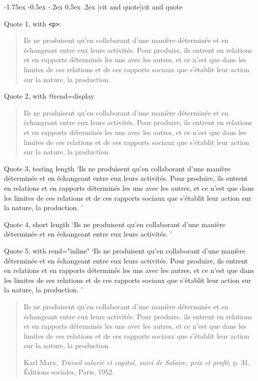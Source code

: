\documentclass[11pt,twoside]{article}\makeatletter
\makeatletter
\renewcommand\section{\@startsection {section}{1}{\z@}%
     {-1.75ex \@plus -0.5ex \@minus -.2ex}%
     {0.5ex \@plus .2ex}%
     {\reset@font\Large\bfseries\sffamily}}
\makeatother
\begin{document}
\section[{cit and quote}]{cit and quote}\par
Quote 1, with \texttt{<p>}: \begin{quote}\par
Ils ne produisent qu’en collaborant d’une manière déterminée et en échangeant entre eux leurs activités. Pour produire, ils entrent en relations et en rapports déterminés les uns avec les autres, et ce n’est que dans les limites de ces relations et de ces rapports sociaux que s’établit leur action sur la nature, la production.\end{quote}\par
Quote 2, with @rend=display \begin{quote}Ils ne produisent qu’en collaborant d’une manière déterminée et en échangeant entre eux leurs activités. Pour produire, ils entrent en relations et en rapports déterminés les uns avec les autres, et ce n’est que dans les limites de ces relations et de ces rapports sociaux que s’établit leur action sur la nature, la production. \end{quote}\par
Quote 3, testing length ‘Ils ne produisent qu’en collaborant d’une manière déterminée et en échangeant entre eux leurs activités. Pour produire, ils entrent en relations et en rapports déterminés les uns avec les autres, et ce n’est que dans les limites de ces relations et de ces rapports sociaux que s’établit leur action sur la nature, la production. ’\par
Quote 4, short length ‘Ils ne produisent qu’en collaborant d’une manière déterminée et en échangeant entre eux leurs activités. ’\par
Quote 5, with rend="inline" ‘Ils ne produisent qu’en collaborant d’une manière déterminée et en échangeant entre eux leurs activités. Pour produire, ils entrent en relations et en rapports déterminés les uns avec les autres, et ce n’est que dans les limites de ces relations et de ces rapports sociaux que s’établit leur action sur la nature, la production. ’
\begin{quote}
 \par
Ils ne produisent qu’en collaborant d’une manière déterminée et en échangeant entre eux leurs activités. Pour produire, ils entrent en relations et en rapports déterminés les uns avec les autres, et ce n’est que dans les limites de ces relations et de ces rapports sociaux que s’établit leur action sur la nature, la production.\par
 {\citbibl Karl Marx, \textit{Travail salarié et capital, suivi de Salaire, prix et profit}, p. 31, Éditions sociales, Paris, 1952.}
\end{quote}
\end{document}
